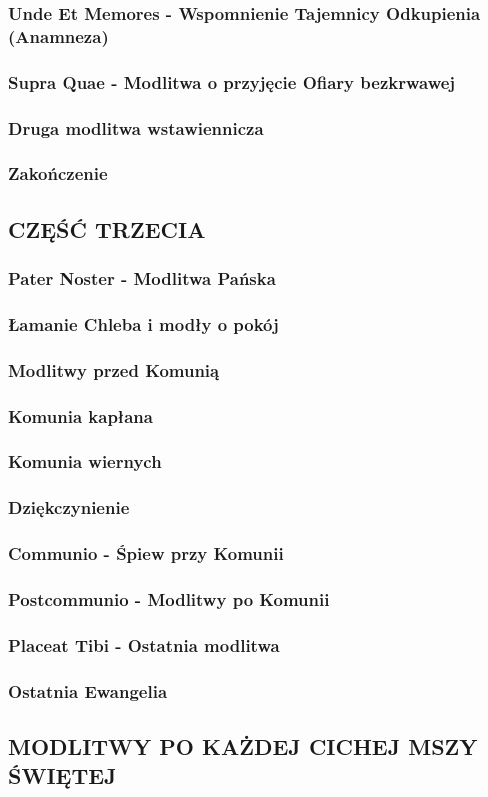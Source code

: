 \documentclass[10pt,titlepage]{article}
\begin{document}
	\subsubsection{Unde Et Memores - Wspomnienie Tajemnicy Odkupienia (Anamneza)}
	\subsubsection{Supra Quae - Modlitwa o przyjęcie Ofiary bezkrwawej}
	\subsubsection{Druga modlitwa wstawiennicza}
	\subsubsection{Zakończenie}
	
	\subsection{CZĘŚĆ TRZECIA}
	
	\subsubsection{Pater Noster - Modlitwa Pańska}
	\subsubsection{Łamanie Chleba i modły o pokój}
	\subsubsection{Modlitwy przed Komunią}
	\subsubsection{Komunia kapłana}
	\subsubsection{Komunia wiernych}
	\subsubsection{Dziękczynienie}
	\subsubsection{Communio - Śpiew przy Komunii}
	\subsubsection{Postcommunio - Modlitwy po Komunii}
	\subsubsection{Placeat Tibi - Ostatnia modlitwa}
	\subsubsection{Ostatnia Ewangelia}
	
	\subsection{MODLITWY PO KAŻDEJ CICHEJ MSZY ŚWIĘTEJ}
	
\end{document}
